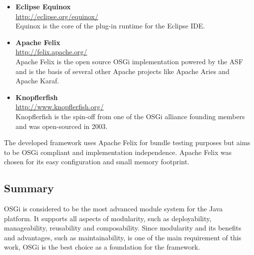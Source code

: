 \begin{itemize}
	\item \textbf{Eclipse Equinox} \\
		\url{http://eclipse.org/equinox/} \\
		Equinox is the core of the plug-in runtime for the Eclipse IDE.
	\item \textbf{Apache Felix} \\
		\url{http://felix.apache.org/} \\
		Apache Felix is the open source \gls{OSGi} implementation powered by the \gls{ASF} and is the basis of several other Apache projects like Apache Aries and Apache Karaf.
	\item \textbf{Knopflerfish} \\
		\url{http://www.knopflerfish.org/} \\
		Knopflerfish is the spin-off from one of the \gls{OSGi} alliance founding members and was open-sourced in 2003.
\end{itemize}

The developed framework uses Apache Felix for bundle testing purposes but aims to be \gls{OSGi} compliant and implementation independence. Apache Felix was chosen for its easy configuration and small memory footprint.

\subsection{Summary}
\gls{OSGi} is considered to be the most advanced module system for the Java platform. It supports all aspects of modularity, such as deployability, manageability, reusability and composability. Since modularity and its benefits and advantages, such as maintainability, is one of the main requirement of this work, \gls{OSGi} is the best choice as a foundation for the framework.

